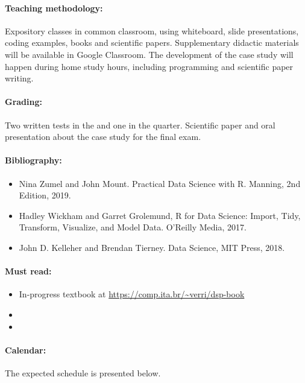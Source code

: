 \paragraph{Teaching methodology:}
Expository classes in common classroom, using whiteboard, slide presentations, coding
examples, books and scientific papers. Supplementary didactic materials will be available
in Google Classroom. The development of the case study will happen during home study
hours, including programming and scientific paper writing.

\paragraph{Grading:} Two written tests in the  and one in the  quarter.
Scientific paper and oral presentation about the case study for the final exam.

\paragraph{Bibliography:}
\begin{itemize}
  \item Nina Zumel and John Mount. Practical Data Science with R. Manning, 2nd Edition, 2019.
  \item Hadley Wickham and Garret Grolemund, R for Data Science: Import, Tidy, Transform, Visualize, and Model Data. O’Reilly Media, 2017.
  \item John D. Kelleher and Brendan Tierney. Data Science, MIT Press, 2018.
\end{itemize}

\thispagestyle{empty}
\paragraph{Must read:}
\begin{itemize}
  \item In-progress textbook at \url{https://comp.ita.br/~verri/dsp-book}
  \item {}
  \item {}
\end{itemize}

\paragraph{Calendar:} The expected schedule is presented below.

